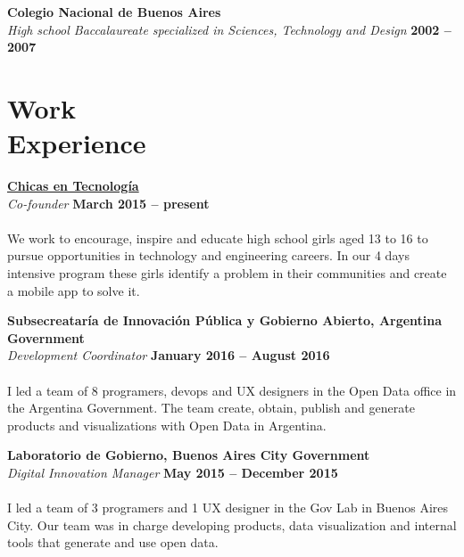 \documentclass[margin,line]{resume}
\begin{document}
\begin{resume}
\textbf{Colegio Nacional de Buenos Aires} \vspace{2mm}\\\vspace{1mm}
\textsl{High school Baccalaureate specialized in Sciences, Technology and Design} \hfill \textbf{ 2002 -- 2007}\vspace{-3mm}\\\vspace{-1mm}

\section{\mysidestyle Work\\Experience}

\textbf{\href{http://www.chicasentecnologia.org/}{Chicas en Tecnolog\'ia}}\\\vspace{1mm}
\textsl{Co-founder} \hfill \textbf{March 2015 -- present}\vspace{-3mm}\\\vspace{-1mm}
\\
We work to encourage, inspire and educate high school girls aged 13 to 16 to pursue opportunities in technology and engineering careers.  In our 4 days intensive program these girls identify a problem in their communities and create a mobile app to solve it.

\textbf{Subsecreatar\'ia de Innovaci\'on P\'ublica y Gobierno Abierto, Argentina Government}\vspace{2mm}\\\vspace{1mm}
\textsl{Development Coordinator} \hfill \textbf{January 2016 -- August 2016}\vspace{-3mm}\\\vspace{-1mm}
\\
I led a team of 8 programers, devops and UX designers in the Open Data office in the Argentina Government. The team create, obtain, publish and generate products and visualizations with Open Data in Argentina.

\textbf{Laboratorio de Gobierno, Buenos Aires City Government}\vspace{2mm}\\\vspace{1mm}
\textsl{Digital Innovation Manager} \hfill \textbf{May 2015 -- December 2015}\vspace{-3mm}\\\vspace{-1mm}
\\
I led a team of 3 programers and 1 UX designer in the Gov Lab in Buenos Aires City. Our team was in charge developing products, data visualization and internal tools that generate and use open data.



\end{resume}
\end{document}
